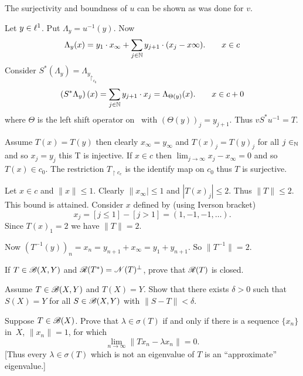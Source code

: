 \begin{enumerate}
\begin{itemize}
The surjectivity and boundness of $u$ can be shown as was done for $v$.

Let \(y\in \ell^1\). Put \(\Lambda_y = u^{-1}(y)\).
Now
\begin{equation*}
\Lambda_y(x) = y_1\cdot x_\infty + \sum_{j\in\mathbb{N}} y_{j+1}\cdot(x_j - x\infty).
\qquad x\in c
\end{equation*}
Consider \(S^*(\Lambda_y) = {\Lambda_y}_{\restriction_{c_0}}\)
\begin{equation*}
\left(S^*\Lambda_y\right)(x) = \sum_{j\in\mathbb{N}} y_{j+1}\cdot x_j
= \Lambda_{\Theta(y)}(x).
\qquad x\in c+0
\end{equation*}
where \(\Theta\) is the left shift operator on \ellone\ with
\((\Theta(y))_j = y_{j+1}\).
Thus \(vS^*u^{-1} = T\).

Assume \(T(x) = T(y)\)
then clearly \(x_\infty = y_\infty\)
and \(T(x)_j = T(y)_j\) for all \(j\in_{\mathbb{N}}\) and so \(x_j = y_j\)
this T is injective.
If \(x\in c\) then \(\lim_{j\to\infty} x_j-x_\infty = 0\) and so \(T(x)\in c_0\).
The restriction \(T_{\restriction c_e}\) is the identify map on \(c_0\)
thus $T$ is surjective.

Let \(x\in c\) and \(\|x\| \leq 1\). Clearly \(\|x_\infty| \leq 1\)
and \(|T(x)_j| \leq 2\). Thus \(\|T\| \leq 2\).
This bound is attained. Consider $x$ defined by (using Iverson bracket)
\begin{equation*}
x_j = [j \leq 1] - [j > 1] = (1, -1, -1, \ldots).
\end{equation*}
Since \(T(x)_1 = 2\) we have \(\|T\| = 2\).

Now \((T^{-1}(y))_n = x_n = y_{n+1} + x_\infty = y_1 + y_{n+1}\).
So \(\|T^{-1}\| = 2\).
\unfinished
\end{itemize}


\unfinished

\begin{excopy}
If \(T \in \mathscr{B}(X,Y)\) and \(\mathscr{R}(T^*) = \mathscr{N}(T)^\perp\),
prove that \(\mathscr{R}(T)\) is closed.
\end{excopy}

\unfinished

\begin{excopy}
Assume \(T \in \mathscr{B}(X,Y)\) and \(T(X)=Y\). Show that there exists \(\delta>0\)
such that \(S(X)=Y\) for all \(S\in\mathscr{B}(X,Y)\) with \(\|S-T\|<\delta\).
\end{excopy}

\begin{excopy}
Suppose \(T \in \mathscr{B}(X)\). Prove that \(\lambda \in \sigma(T)\) if and only if
there is a sequence \(\{x_n\}\) in~$X$, \(\|x_n\|=1\), for which 
\begin{equation*}
\lim_{n\to\infty} \|T x_n - \lambda x_n\| = 0.
\end{equation*}
[Thus every \(\lambda \in \sigma(T)\) which is not an eigenvalue of $T$
is an ``approximate'' eigenvalue.]
\end{excopy}

\unfinished

\end{enumerate}
